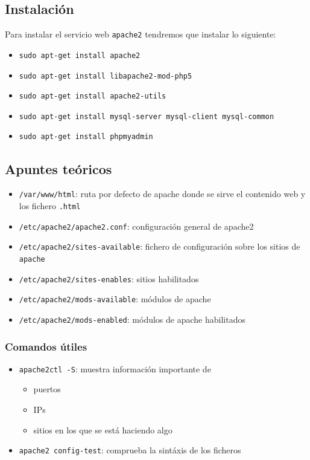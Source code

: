 \documentclass[11pt]{article}
\begin{document}
\subsection{Instalación}
\label{sec:org7ae091d}
Para instalar el servicio web \texttt{apache2} tendremos que instalar lo siguiente:
\begin{itemize}
\item \texttt{sudo apt-get install apache2}
\item \texttt{sudo apt-get install libapache2-mod-php5}
\item \texttt{sudo apt-get install apache2-utils}
\item \texttt{sudo apt-get install mysql-server mysql-client mysql-common}
\item \texttt{sudo apt-get install phpmyadmin}
\end{itemize}
\subsection{Apuntes teóricos}
\label{sec:org5d03c33}
\begin{itemize}
\item \texttt{/var/www/html}: ruta por defecto de apache donde se sirve el contenido web y los fichero \texttt{.html}
\item \texttt{/etc/apache2/apache2.conf}: configuración general de apache2
\item \texttt{/etc/apache2/sites-available}: fichero de configuración sobre los sitios de \texttt{apache}
\item \texttt{/etc/apache2/sites-enables}: sitios habilitados
\item \texttt{/etc/apache2/mods-available}: módulos de apache
\item \texttt{/etc/apache2/mods-enabled}: módulos de apache habilitados
\end{itemize}

\subsubsection{Comandos útiles}
\label{sec:orge4c9cc1}
\begin{itemize}
\item \texttt{apache2ctl -S}: muestra información importante de
\begin{itemize}
\item puertos
\item IPs
\item sitios en los que se está haciendo algo
\end{itemize}
\item \texttt{apache2 config-test}: comprueba la sintáxis de los ficheros
\end{itemize}
\end{document}
